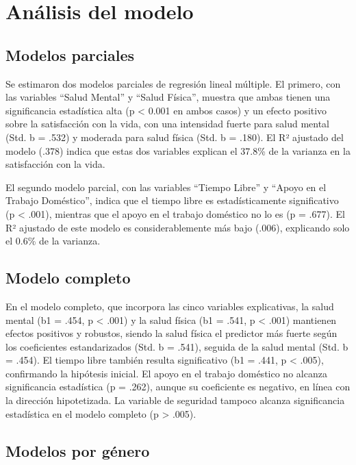 \documentclass[
  spanish,
  a4paper,
  oneside]{scrbook}
\begin{document}
\section{Análisis del modelo}\label{anuxe1lisis-del-modelo}

\subsection{Modelos parciales}\label{modelos-parciales}

Se estimaron dos modelos parciales de regresión lineal múltiple. El
primero, con las variables ``Salud Mental'' y ``Salud Física'', muestra
que ambas tienen una significancia estadística alta (p \textless{} 0.001
en ambos casos) y un efecto positivo sobre la satisfacción con la vida,
con una intensidad fuerte para salud mental (Std. b = .532) y moderada
para salud física (Std. b = .180). El R² ajustado del modelo (.378)
indica que estas dos variables explican el 37.8\% de la varianza en la
satisfacción con la vida.

El segundo modelo parcial, con las variables ``Tiempo Libre'' y ``Apoyo
en el Trabajo Doméstico'', indica que el tiempo libre es
estadísticamente significativo (p \textless{} .001), mientras que el
apoyo en el trabajo doméstico no lo es (p = .677). El R² ajustado de
este modelo es considerablemente más bajo (.006), explicando solo el
0.6\% de la varianza.

\subsection{Modelo completo}\label{modelo-completo}

En el modelo completo, que incorpora las cinco variables explicativas,
la salud mental (b1 = .454, p \textless{} .001) y la salud física (b1 =
.541, p \textless{} .001) mantienen efectos positivos y robustos, siendo
la salud física el predictor más fuerte según los coeficientes
estandarizados (Std. b = .541), seguida de la salud mental (Std. b =
.454). El tiempo libre también resulta significativo (b1 = .441, p
\textless{} .005), confirmando la hipótesis inicial. El apoyo en el
trabajo doméstico no alcanza significancia estadística (p = .262),
aunque su coeficiente es negativo, en línea con la dirección
hipotetizada. La variable de seguridad tampoco alcanza significancia
estadística en el modelo completo (p \textgreater{} .005).

\subsection{Modelos por género}\label{modelos-por-guxe9nero}
\end{document}
